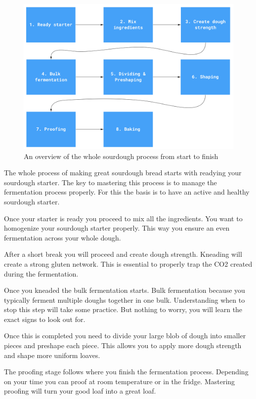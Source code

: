 \begin{figure}[!htb]
  \includegraphics[width=\textwidth]{sourdough-process-overview.jpg}
  \caption{An overview of the whole sourdough process from start to finish}
\end{figure}

The whole process of making great sourdough bread starts with
readying your sourdough starter. The key to mastering
this process is to manage the fermentation process properly.
For this the basis is to have an active and healthy
sourdough starter.

Once your starter is ready you proceed to mix all the ingredients.
You want to homogenize your sourdough starter properly. This
way you ensure an even fermentation across your whole dough.

After a short break you will proceed and create dough strength.
Kneading will create a strong gluten network. This is essential
to properly trap the CO2 created during the fermentation.

Once you kneaded the bulk fermentation starts. Bulk fermentation
because you typically ferment multiple doughs together in one bulk.
Understanding when to stop this step will take some practice.
But nothing to worry, you will learn the exact signs to look out for.

Once this is completed you need to divide your large blob of
dough into smaller pieces and preshape each piece. This allows
you to apply more dough strength and shape more uniform loaves.

The proofing stage follows where you finish the fermentation process.
Depending on your time you can proof at room temperature or in the fridge.
Mastering proofing will turn your good loaf into a great loaf.

